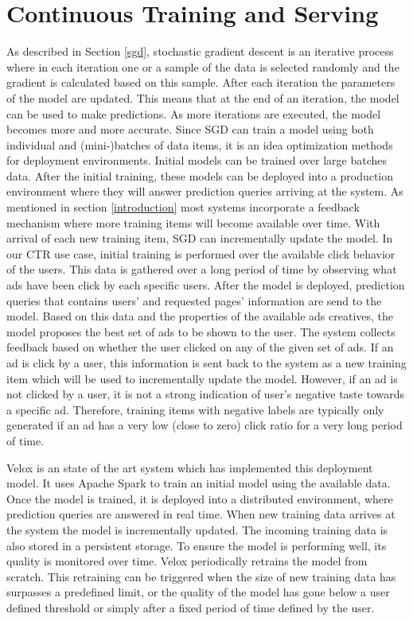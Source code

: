 \documentclass{vldb}
\begin{document}
\section{Continuous Training and Serving} \label{continious-training-serving}
As described in Section \ref{sgd}, stochastic gradient descent is an iterative process where in each iteration one or a sample of the data is selected randomly and the gradient is calculated based on this sample. 
After each iteration the parameters of the model are updated.
This means that at the end of an iteration, the model can be used to make predictions.
As more iterations are executed, the model becomes more and more accurate.
Since SGD can train a model using both individual and (mini-)batches of data items, it is an idea optimization methods for deployment environments.
Initial models can be trained over large batches data.
After the initial training, these models can be deployed into a production environment where they will answer prediction queries arriving at the system.
As mentioned in section \ref{introduction} most systems incorporate a feedback mechanism where more training items will become available over time.
With arrival of each new training item, SGD can incrementally update the model.
In our CTR use case, initial training is performed over the available click behavior of the users.
This data is gathered over a long period of time by observing what ads have been click by each specific users.
After the model is deployed, prediction queries that contains users' and requested pages' information are send to the model.
Based on this data and the properties of the available ads creatives, the model proposes the best set of ads to be shown to the user.
The system collects feedback based on whether the user clicked on any of the given set of ads.
If an ad is click by a user, this information is sent back to the system as a new training item which will be used to incrementally update the model.
However, if an ad is not clicked by a user, it is not a strong indication of user's negative taste towards a specific ad.
Therefore, training items with negative labels are typically only generated if an ad has a very low (close to zero) click ratio for a very long period of time.

Velox \cite{crankshaw2014missing} is an state of the art system which has implemented this deployment model.
It uses Apache Spark to train an initial model using the available data.
Once the model is trained, it is deployed into a distributed environment, where prediction queries are answered in real time.
When new training data arrives at the system the model is incrementally updated.
The incoming training data is also stored in a persistent storage.
To ensure the model is performing well, its quality is monitored over time.
Velox periodically retrains the model from scratch. 
This retraining can be triggered when the size of new training data has surpasses a predefined limit, or the quality of the model has gone below a user defined threshold or simply after a fixed period of time defined by the user.
\end{document}
